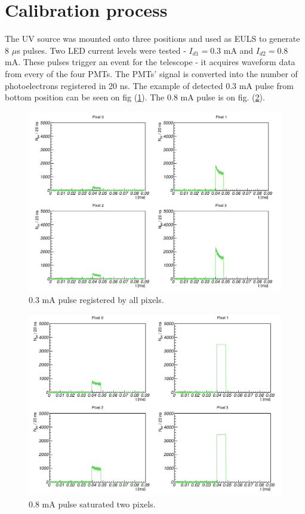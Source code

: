 \section{Calibration process}
The UV source was mounted onto three positions and used as EULS to generate $8$ $\mu$s pulses. Two LED current levels were tested - $I_{d1} = 0.3$ mA and $I_{d2} = 0.8$ mA. These pulses trigger an event for the telescope - it acquires waveform data from every of the four PMTs. The PMTs' signal is converted into the number of photoelectrons registered in 20 ns. The example of detected 0.3 mA pulse from bottom position can be seen on fig (\ref{03pulse}). The 0.8 mA pulse is on fig. (\ref{08pulse}).

\begin{figure}[H]
 \centering
 \includegraphics[scale=0.42, angle = 0]{./pictures/CalibPulses.png}
 \caption{0.3 mA pulse registered by all pixels.}
 \label{03pulse}
 
\end{figure}

\begin{figure}[H]
 \centering
 \includegraphics[scale=0.42, angle = 0]{./pictures/CalibSaturated.png}
 \caption{0.8 mA pulse saturated two pixels.}
 \label{08pulse}
 
\end{figure}


